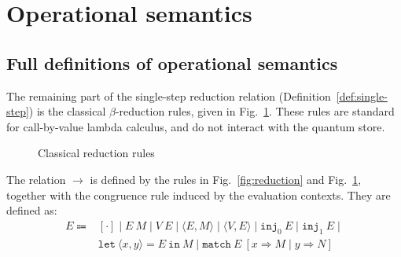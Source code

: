 \section{Operational semantics}
\subsection{Full definitions of operational semantics} \label{sec:opsem-full}
The remaining part of the single-step reduction relation (Definition~\ref{def:single-step}) is the classical $\beta$-reduction rules, given in Fig.~\ref{fig:reduction-beta}.
These rules are standard for call-by-value lambda calculus, and do not interact with the quantum store.
\begin{figure}[ht]
  \caption{Classical reduction rules}
  \label{fig:reduction-beta}
\end{figure}

The relation $\longrightarrow$ is defined by the rules in Fig.~\ref{fig:reduction} and Fig.~\ref{fig:reduction-beta}, together with the congruence rule induced by the evaluation contexts.
They are defined as:
\begin{equation*}
  \begin{array}{rl}
    E \Coloneqq & [\cdot]\mid E\ M\mid V\ E\mid\langle E, M\rangle\mid\langle V,E\rangle\mid\texttt{inj}_0\ E\mid\texttt{inj}_1\ E\mid \\
                & \texttt{let}\ \langle x,y\rangle=E\ \texttt{in}\ M\mid\texttt{match}\ E\ [x\Rightarrow M\mid y\Rightarrow N ]
  \end{array}
\end{equation*}

